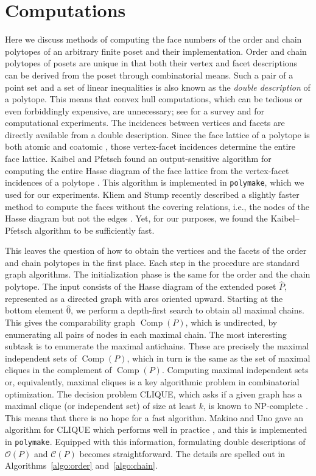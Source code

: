 \documentclass[12pt,a4paper]{amsart}
\theoremstyle{definition}
\newcommand{\OP}{\mathcal{O}}
\newcommand{\CP}{\mathcal{C}}
\newcommand{\comp}{{\operatorname*{Comp}}}
\newcommand\polymake{\texttt{polymake}\xspace}
\begin{document}
\section{Computations}\label{sec-comp}

Here we discuss methods of computing the face numbers of the order and chain polytopes of an arbitrary finite poset and their implementation.
Order and chain polytopes of posets are unique in that both their vertex and facet descriptions can be derived from the poset through combinatorial means.
Such a pair of a point set and a set of linear inequalities is also known as the \emph{double description} of a polytope.
This means that convex hull computations, which can be tedious or even forbiddingly expensive, are unnecessary; see \cite{HDCG3:convex+hulls} for a survey and \cite{AvisBremnerSeidel:1997,polymake:2017} for computational experiments.
The incidences between vertices and facets are directly available from a double description.
Since the face lattice of a polytope is both atomic and coatomic \cite[\S2.2]{Ziegler:1995}, those vertex-facet incidences determine the entire face lattice.
Kaibel and Pfetsch found an output-sensitive algorithm for computing the entire Hasse diagram of the face lattice from the vertex-facet incidences of a polytope \cite{KaibelPfetsch:2002}.
This algorithm is implemented in \polymake \cite{polymake:2017}, which we used for our experiments.
Kliem and Stump recently described a slightly faster method to compute the faces without the covering relations, i.e., the nodes of the Hasse diagram but not the edges \cite{KliemStump:2022}.
Yet, for our purposes, we found the Kaibel--Pfetsch algorithm to be  sufficiently fast.

This leaves the question of how to obtain the vertices and the facets of the order and chain polytopes in the first place.
Each step in the procedure are standard graph algorithms.
The initialization phase is the same for the order and the chain polytope.
The input consists of the Hasse diagram of the extended poset $\hat{P}$, represented as a directed graph with arcs oriented upward.
Starting at the bottom element $\hat{0}$, we perform a depth-first search to obtain all maximal chains.
This gives the comparability graph $\comp(P)$, which is undirected, by enumerating all pairs of nodes in each maximal chain.
The most interesting subtask is to enumerate the maximal antichains.
These are precisely the maximal independent sets of $\comp(P)$, which in turn is the same as the set of maximal cliques in the complement of $\comp(P)$.
Computing maximal independent sets or, equivalently, maximal cliques is a key algorithmic problem in combinatorial optimization.
The decision problem CLIQUE, which asks if a given graph has a maximal clique (or independent set) of size at least $k$, is known to NP-complete \cite[GT19]{GareyJohnson:1979}.
This means that there is no hope for a fast algorithm.
Makino and Uno gave an algorithm for CLIQUE which performs well in practice \cite{MakinoUno:2004}, and this is implemented in \polymake.
Equipped with this information, formulating double descriptions of $\OP(P)$ and $\CP(P)$ becomes straightforward.
The details are spelled out in Algorithms~\ref{algo:order} and~\ref{algo:chain}.
\end{document}
